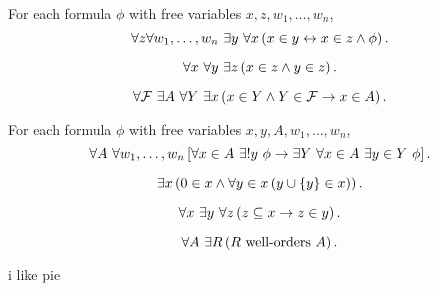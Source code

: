 \begin{axiom}
    For each formula \(\phi\) with free variables \(x,z,w_1,\dots,w_n\),
    \[ \forall z \forall w_1,\dots,w_n\ \exists y\ \forall x\paren{x\in y\leftrightarrow x\in z\land \phi}. \]
\end{axiom}
\begin{axiom}[Pairing]
    \[\forall x\ \forall y\ \exists z\left(x\in z\land y\in z\right).\]
\end{axiom}
\begin{axiom}[Union]
    \[\forall\mathcal{F}\ \exists A\ \forall Y\ \exists x\left(x\in Y\land Y\in\mathcal{F}\to x\in A\right). \]
\end{axiom}
\begin{axiom}
    For each formula \(\phi\) with free variables \(x,y,A,w_1,\dots,w_n\), \[ \forall A\ \forall w_1,\dots,w_n \sq{\forall x\in A\ \exists! y\ \phi \to \exists Y\ \forall x\in A\ \exists y\in Y\ \phi} .\]
\end{axiom}
\begin{axiom}[Infinity]
    \[\exists x\left(0\in x\land \forall y\in x\left(y\cup\left\{ y \right\} \in x\right)\right). \]
\end{axiom}
\begin{axiom}
    \[\forall x\ \exists y\ \forall z\left(z\subseteq x\to z\in y\right).\]
\end{axiom}
\begin{axiom}[Choice]
    \[ \forall A\ \exists R \left(R \text{ well-orders } A\right). \]
\end{axiom}


i like pie \autocite{kunen1980}
